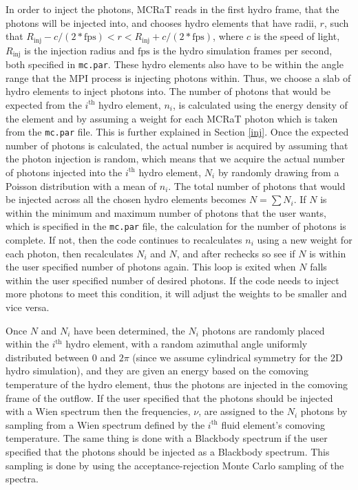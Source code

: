 \documentclass[12pt,a4paper]{article}
\begin{document}
In order to inject the photons, MCRaT reads in the first hydro frame, that the photons will be injected into, and chooses hydro elements that have radii, $r$, such that $R_\mathrm{inj}-c/(2*\mathrm{fps}) < r < R_\mathrm{inj}+c/(2*\mathrm{fps})$, where $c$ is the speed of light, $R_\mathrm{inj}$ is the injection radius and $\mathrm{fps}$ is the hydro simulation frames per second, both specified in \texttt{mc.par}. These hydro elements also have to be within the angle range that the MPI process is injecting photons within. Thus, we choose a slab of hydro elements to inject photons into. The number of photons that would be expected from the $i^\mathrm{th}$ hydro element, $n_i$, is calculated using the energy density of the element and by assuming a weight for each MCRaT photon which is taken from the \texttt{mc.par} file. This is further explained in Section \ref{inj}. Once the expected number of photons is calculated, the actual number is acquired by assuming that the photon injection is random, which means that we acquire the actual number of photons injected into the $i^\mathrm{th}$ hydro element, $N_i$ by randomly drawing from a Poisson distribution with a mean of $n_i$. The total number of photons that would be injected across all the chosen hydro elements becomes $N=\sum N_i$. If $N$ is within the minimum and maximum number of photons that the user wants, which is specified in the \texttt{mc.par} file, the calculation for the number of photons is complete. If not, then the code continues to recalculates $n_i$ using a new weight for each photon, then recalculates $N_i$ and $N$, and after rechecks so see if $N$ is within the user specified number of photons again. This loop is exited when $N$ falls within the user specified number of desired photons. If the code needs to inject more photons to meet this condition, it will adjust the weights to be smaller and vice versa.

Once $N$ and $N_i$ have been determined, the $N_i$ photons are randomly placed within the $i^\mathrm{th}$ hydro element, with a random azimuthal angle uniformly distributed between $0$ and $2\pi$ (since we assume cylindrical symmetry for the 2D hydro simulation), and they are given an energy based on the comoving temperature of the hydro element, thus the photons are injected in the comoving frame of the outflow. If the user specified that the photons should be injected with a Wien spectrum then the frequencies, $\nu$, are assigned to the $N_i$ photons by sampling from a Wien spectrum defined by the $i^\mathrm{th}$ fluid element's comoving temperature. The same thing is done with a Blackbody spectrum if the user specified that the photons should be injected as a Blackbody spectrum. This sampling is done by using the acceptance-rejection Monte Carlo sampling of the spectra.
\end{document}
